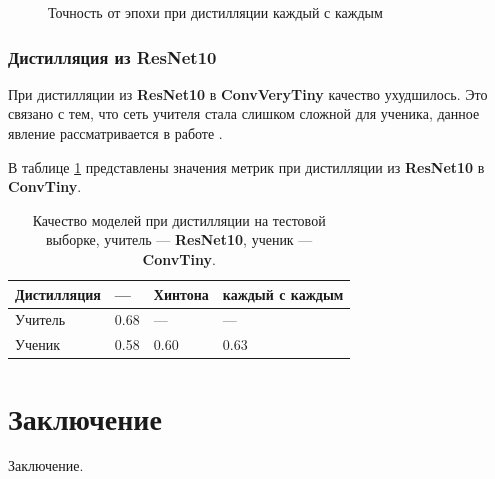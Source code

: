 \documentclass[14]{article}
\begin{document}
\begin{figure}
  \caption{Точность от эпохи при дистилляции каждый с каждым}
  \label{ris:tiny_accuracy}
\end{figure}

\subsubsection{Дистилляция из \textbf{ResNet10}}

При дистилляции из \textbf{ResNet10} в \textbf{ConvVeryTiny} качество ухудшилось.
Это связано с тем, что сеть учителя стала слишком сложной для ученика,
данное явление рассматривается в работе \cite{mirzadeh2020improved}.

В таблице \ref{table:resnet10} представлены значения метрик при дистилляции из \textbf{ResNet10} в \textbf{ConvTiny}.


\begin{table}[h!]
  \centering
  \begin{tabular}{|l|l|l|l|}
    \hline
    Дистилляция & ---  & Хинтона & каждый с каждым \\ \hline
    Учитель     & 0.68 & ---     & ---             \\ \hline
    Ученик      & 0.58 & 0.60    & 0.63            \\ \hline
  \end{tabular}
  \caption{Качество моделей при дистилляции на тестовой выборке, учитель --- \textbf{ResNet10}, ученик --- \textbf{ConvTiny}.}
  \label{table:resnet10}
\end{table}

\section{Заключение}
Заключение.


\newpage


\end{document}
